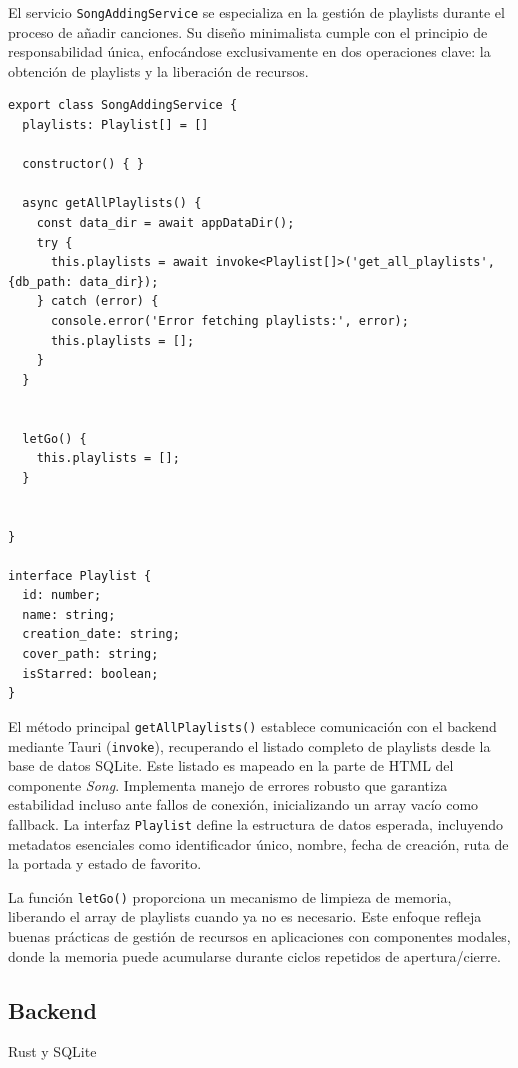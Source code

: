 \documentclass[11pt, a4paper]{article}
\begin{document}
                El servicio \texttt{SongAddingService} se especializa en la gestión de playlists durante el proceso de añadir canciones. Su diseño minimalista cumple con el principio de responsabilidad única, enfocándose exclusivamente en dos operaciones clave: la obtención de playlists y la liberación de recursos.

                \begin{lstlisting}[caption={song-adding.service.ts}]
export class SongAddingService {
  playlists: Playlist[] = []

  constructor() { }

  async getAllPlaylists() {
    const data_dir = await appDataDir();
    try {
      this.playlists = await invoke<Playlist[]>('get_all_playlists', {db_path: data_dir});
    } catch (error) {
      console.error('Error fetching playlists:', error);
      this.playlists = [];
    }
  }


  letGo() {
    this.playlists = [];
  }


}

interface Playlist {
  id: number;
  name: string;
  creation_date: string;
  cover_path: string;
  isStarred: boolean;
}
                \end{lstlisting}

                El método principal \texttt{getAllPlaylists()} establece comunicación con el backend mediante Tauri (\texttt{invoke}), recuperando el listado completo de playlists desde la base de datos SQLite. Este listado es mapeado en la parte de HTML del componente \textit{Song}. Implementa manejo de errores robusto que garantiza estabilidad incluso ante fallos de conexión, inicializando un array vacío como fallback. La interfaz \texttt{Playlist} define la estructura de datos esperada, incluyendo metadatos esenciales como identificador único, nombre, fecha de creación, ruta de la portada y estado de favorito.

                La función \texttt{letGo()} proporciona un mecanismo de limpieza de memoria, liberando el array de playlists cuando ya no es necesario. Este enfoque refleja buenas prácticas de gestión de recursos en aplicaciones con componentes modales, donde la memoria puede acumularse durante ciclos repetidos de apertura/cierre.

        \subsection{Backend}

        Rust y SQLite
\end{document}
